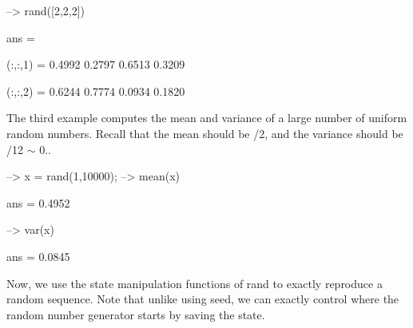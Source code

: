 \begin{DoxyVerbInclude}
--> rand([2,2,2])

ans = 

(:,:,1) = 
    0.4992    0.2797 
    0.6513    0.3209 

(:,:,2) = 
    0.6244    0.7774 
    0.0934    0.1820 
\end{DoxyVerbInclude}


The third example computes the mean and variance of a large number of uniform random numbers. Recall that the mean should be {/2}, and the variance should be {/12 $\sim$ 0.}.


\begin{DoxyVerbInclude}
--> x = rand(1,10000);
--> mean(x)

ans = 
    0.4952 

--> var(x)

ans = 
    0.0845 
\end{DoxyVerbInclude}


Now, we use the state manipulation functions of {\ttfamily rand} to exactly reproduce a random sequence. Note that unlike using {\ttfamily seed}, we can exactly control where the random number generator starts by saving the state.


